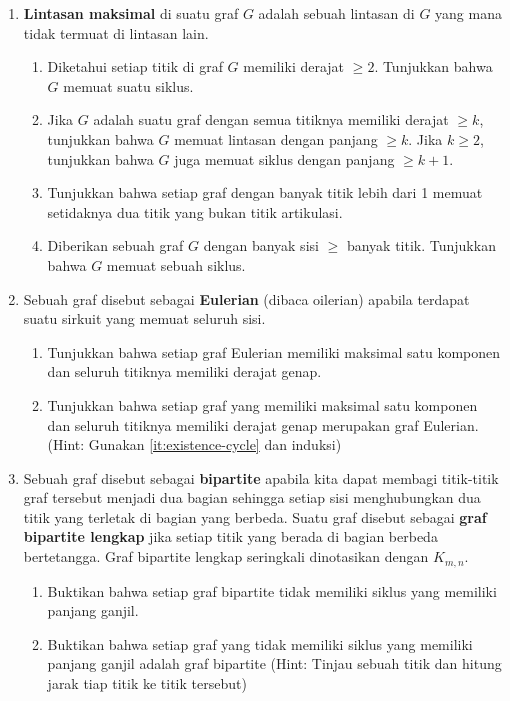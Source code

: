 \documentclass[11pt]{scrartcl}
\begin{document}
\begin{enumerate}
    \item \textbf{Lintasan maksimal} di suatu graf $G$ adalah sebuah lintasan di $G$ yang mana tidak termuat di lintasan lain.
    \begin{enumerate}
        \item \label{it:existence-cycle} Diketahui setiap titik di graf $G$ memiliki derajat $\geq 2$. Tunjukkan bahwa $G$ memuat suatu siklus.
        \item Jika $G$ adalah suatu graf dengan semua titiknya memiliki derajat $\geq k$, tunjukkan bahwa $G$ memuat lintasan dengan panjang $\geq k$. Jika $k\geq 2$, tunjukkan bahwa $G$ juga memuat siklus dengan panjang $\geq k + 1$.
        \item Tunjukkan bahwa setiap graf dengan banyak titik lebih dari 1 memuat setidaknya dua titik yang bukan titik artikulasi.
        \item Diberikan sebuah graf $G$ dengan banyak sisi $\geq$ banyak titik. Tunjukkan bahwa $G$ memuat sebuah siklus.
    \end{enumerate}
    \item Sebuah graf disebut sebagai \textbf{Eulerian} (dibaca oilerian) apabila terdapat suatu sirkuit yang memuat seluruh sisi.   
    \begin{enumerate}
        \item Tunjukkan bahwa setiap graf Eulerian memiliki maksimal satu komponen dan seluruh titiknya memiliki derajat genap.
        \item Tunjukkan bahwa setiap graf yang memiliki maksimal satu komponen dan seluruh titiknya memiliki derajat genap merupakan graf Eulerian. (Hint: Gunakan \ref{it:existence-cycle} dan induksi) 
    \end{enumerate}
    \item Sebuah graf disebut sebagai \textbf{bipartite} apabila kita dapat membagi titik-titik graf tersebut menjadi dua bagian sehingga setiap sisi menghubungkan dua titik yang terletak di bagian yang berbeda. Suatu graf disebut sebagai \textbf{graf bipartite lengkap} jika setiap titik yang berada di bagian berbeda bertetangga. Graf bipartite lengkap seringkali dinotasikan dengan $K_{m,n}$.
    \begin{enumerate}
        \item Buktikan bahwa setiap graf bipartite tidak memiliki siklus yang memiliki panjang ganjil.
        \item Buktikan bahwa setiap graf yang tidak memiliki siklus yang memiliki panjang ganjil adalah graf bipartite (Hint: Tinjau sebuah titik dan hitung jarak tiap titik ke titik tersebut)

\end{enumerate}
\end{enumerate}
\end{document}
